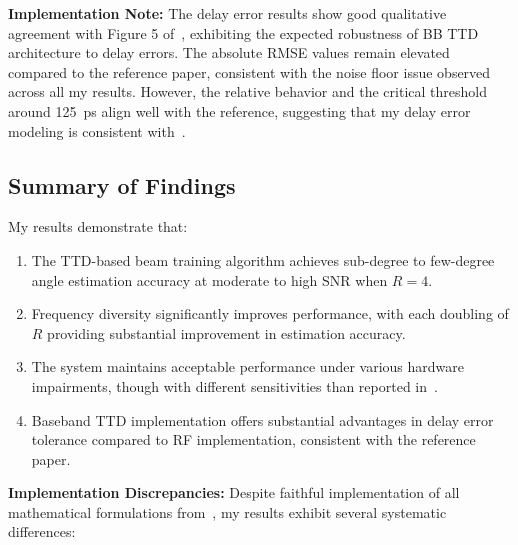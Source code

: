 \documentclass[12pt,letterpaper]{article}
\begin{document}
\textbf{Implementation Note:} The delay error results show good qualitative agreement with Figure 5 of~\cite{boljanovic2020design}, exhibiting the expected robustness of BB TTD architecture to delay errors. The absolute RMSE values remain elevated compared to the reference paper, consistent with the noise floor issue observed across all my results. However, the relative behavior and the critical threshold around 125~ps align well with the reference, suggesting that my delay error modeling is consistent with~\cite{boljanovic2020design}.

\subsection{Summary of Findings}

My results demonstrate that:
\begin{enumerate}
    \item The TTD-based beam training algorithm achieves sub-degree to few-degree angle estimation accuracy at moderate to high SNR when $R = 4$.
    \item Frequency diversity significantly improves performance, with each doubling of $R$ providing substantial improvement in estimation accuracy.
    \item The system maintains acceptable performance under various hardware impairments, though with different sensitivities than reported in~\cite{boljanovic2020design}.
    \item Baseband TTD implementation offers substantial advantages in delay error tolerance compared to RF implementation, consistent with the reference paper.
\end{enumerate}

\textbf{Implementation Discrepancies:} Despite faithful implementation of all mathematical formulations from~\cite{boljanovic2020design}, my results exhibit several systematic differences:
\end{document}
